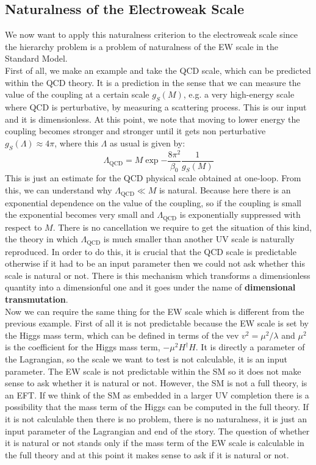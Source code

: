 \documentclass[../main.tex]{subfiles}
\begin{document}
\subsection{Naturalness of the Electroweak Scale}
We now want to apply this naturalness criterion to the electroweak scale since the hierarchy problem is a problem of naturalness of the EW scale in the Standard Model.\\
First of all, we make an example and take the QCD scale, which can be predicted within the QCD theory. It is a prediction in the sense that we can measure the value of the coupling at a certain scale $g_S(M)$, e.g. a very high-energy scale where QCD is perturbative, by measuring a scattering process. This is our input and it is dimensionless. At this point, we note that moving to lower energy the coupling becomes stronger and stronger until it gets non perturbative $g_S(\Lambda)\approx4\pi$, where this $\Lambda$ as usual is given by:
\[
\Lambda_{\text{QCD}}=M\exp{-\frac{8\pi^2}{\beta_0}\frac{1}{g_S(M)}}
\]
This is just an estimate for the QCD physical scale obtained at one-loop. From this, we can understand why $\Lambda_{\text{QCD}}\ll M$ is natural. Because here there is an exponential dependence on the value of the coupling, so if the coupling is small the exponential becomes very small and $\Lambda_{\text{QCD}}$ is exponentially suppressed with respect to $M$. There is no cancellation we require to get the situation of this kind, the theory in which $\Lambda_{\text{QCD}}$ is much smaller than another UV scale is naturally reproduced. In order to do this, it is crucial that the QCD scale is predictable otherwise if it had to be an input parameter then we could not ask whether this scale is natural or not. There is this mechanism which transforms a dimensionless quantity into a dimensionful one and it goes under the name of \textbf{dimensional transmutation}.\\
Now we can require the same thing for the EW scale which is different from the previous example. First of all it is not predictable because the EW scale is set by the Higgs mass term, which can be defined in terms of the vev $v^2=\mu^2/\lambda$ and $\mu^2$ is the coefficient for the Higgs mass term, $-\mu^2H^\dagger H$. It is directly a parameter of the Lagrangian, so the scale we want to test is not calculable, it is an input parameter. The EW scale is not predictable within the SM so it does not make sense to ask whether it is natural or not. However, the SM is not a full theory, is an EFT. If we think of the SM as embedded in a larger UV completion there is a possibility that the mass term of the Higgs can be computed in the full theory. If it is not calculable then there is no problem, there is no naturalness, it is just an input parameter of the Lagrangian and end of the story. The question of whether it is natural or not stands only if the mass term of the EW scale is calculable in the full theory and at this point it makes sense to ask if it is natural or not.\\
\end{document}
